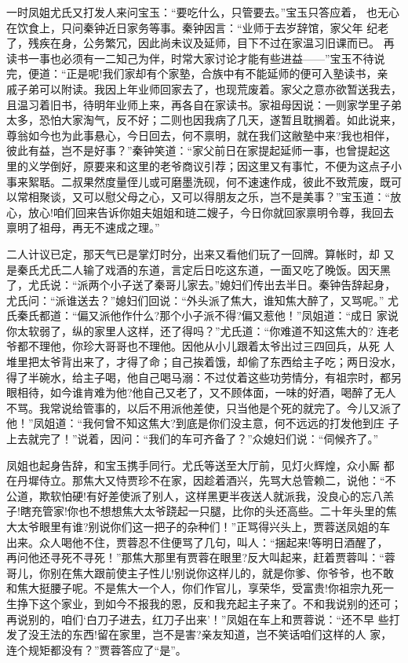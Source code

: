 一时凤姐尤氏又打发人来问宝玉：“要吃什么，只管要去。”宝玉只答应着，
也无心在饮食上，只问秦钟近日家务等事。秦钟因言：“业师于去岁辞馆，家父年
纪老了，残疾在身，公务繁冗，因此尚未议及延师，目下不过在家温习旧课而已。
再读书一事也必须有一二知己为伴，时常大家讨论才能有些进益——”宝玉不待说
完，便道：“正是呢!我们家却有个家塾，合族中有不能延师的便可入塾读书，亲
戚子弟可以附读。我因上年业师回家去了，也现荒废着。家父之意亦欲暂送我去，
且温习着旧书，待明年业师上来，再各自在家读书。家祖母因说：一则家学里子弟
太多，恐怕大家淘气，反不好；二则也因我病了几天，遂暂且耽搁着。如此说来，
尊翁如今也为此事悬心，今日回去，何不禀明，就在我们这敝塾中来?我也相伴，
彼此有益，岂不是好事？”秦钟笑道：“家父前日在家提起延师一事，也曾提起这
里的义学倒好，原要来和这里的老爷商议引荐；因这里又有事忙，不便为这点子小
事来絮聒。二叔果然度量侄儿或可磨墨洗砚，何不速速作成，彼此不致荒废，既可
以常相聚谈，又可以慰父母之心，又可以得朋友之乐，岂不是美事？”宝玉道：“放
心，放心!咱们回来告诉你姐夫姐姐和琏二嫂子，今日你就回家禀明令尊，我回去
禀明了祖母，再无不速成之理。”

二人计议已定，那天气已是掌灯时分，出来又看他们玩了一回牌。算帐时，却
又是秦氏尤氏二人输了戏酒的东道，言定后日吃这东道，一面又吃了晚饭。因天黑
了，尤氏说：“派两个小子送了秦哥儿家去。”媳妇们传出去半日。秦钟告辞起身，
尤氏问：“派谁送去？”媳妇们回说：“外头派了焦大，谁知焦大醉了，又骂呢。”
尤氏秦氏都道：“偏又派他作什么?那个小子派不得?偏又惹他！”凤姐道：“成日
家说你太软弱了，纵的家里人这样，还了得吗？”尤氏道：“你难道不知这焦大的?
连老爷都不理他，你珍大哥哥也不理他。因他从小儿跟着太爷出过三四回兵，从死
人堆里把太爷背出来了，才得了命；自己挨着饿，却偷了东西给主子吃；两日没水，
得了半碗水，给主子喝，他自己喝马溺：不过仗着这些功劳情分，有祖宗时，都另
眼相待，如今谁肯难为他?他自己又老了，又不顾体面，一味的好酒，喝醉了无人
不骂。我常说给管事的，以后不用派他差使，只当他是个死的就完了。今儿又派了
他！”凤姐道：“我何曾不知这焦大?到底是你们没主意，何不远远的打发他到庄
子上去就完了！”说着，因问：“我们的车可齐备了？”众媳妇们说：“伺候齐了。”

凤姐也起身告辞，和宝玉携手同行。尤氏等送至大厅前，见灯火辉煌，众小厮
都在丹墀侍立。那焦大又恃贾珍不在家，因趁着酒兴，先骂大总管赖二，说他：“不
公道，欺软怕硬!有好差使派了别人，这样黑更半夜送人就派我，没良心的忘八羔
子!瞎充管家!你也不想想焦大太爷跷起一只腿，比你的头还高些。二十年头里的焦
大太爷眼里有谁?别说你们这一把子的杂种们！”正骂得兴头上，贾蓉送凤姐的车
出来。众人喝他不住，贾蓉忍不住便骂了几句，叫人：“捆起来!等明日酒醒了，
再问他还寻死不寻死！”那焦大那里有贾蓉在眼里?反大叫起来，赶着贾蓉叫：“蓉
哥儿，你别在焦大跟前使主子性儿!别说你这样儿的，就是你爹、你爷爷，也不敢
和焦大挺腰子呢。不是焦大一个人，你们作官儿，享荣华，受富贵!你祖宗九死一
生挣下这个家业，到如今不报我的恩，反和我充起主子来了。不和我说别的还可；
再说别的，咱们‘白刀子进去，红刀子出来’！”凤姐在车上和贾蓉说：“还不早
些打发了没王法的东西!留在家里，岂不是害?亲友知道，岂不笑话咱们这样的人
家，连个规矩都没有？”贾蓉答应了“是”。

